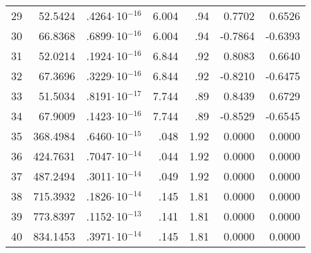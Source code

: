 {\begin{longtable}{|l||r|r|r|r|r|r|}
29 & 52.5424 & .4264$\cdot$\,10$^{-16}$ & 6.004 & .94 & 0.7702 & 0.6526 \\
30 & 66.8368 & .6899$\cdot$\,10$^{-16}$ & 6.004 & .94 & -0.7864 & -0.6393 \\
31 & 52.0214 & .1924$\cdot$\,10$^{-16}$ & 6.844 & .92 & 0.8083 & 0.6640 \\
32 & 67.3696 & .3229$\cdot$\,10$^{-16}$ & 6.844 & .92 & -0.8210 & -0.6475 \\
33 & 51.5034 & .8191$\cdot$\,10$^{-17}$ & 7.744 & .89 & 0.8439 & 0.6729 \\
34 & 67.9009 & .1423$\cdot$\,10$^{-16}$ & 7.744 & .89 & -0.8529 & -0.6545 \\
35 & 368.4984 & .6460$\cdot$\,10$^{-15}$ & .048 & 1.92 & 0.0000 & 0.0000 \\
36 & 424.7631 & .7047$\cdot$\,10$^{-14}$ & .044 & 1.92 & 0.0000 & 0.0000 \\
37 & 487.2494 & .3011$\cdot$\,10$^{-14}$ & .049 & 1.92 & 0.0000 & 0.0000 \\
38 & 715.3932 & .1826$\cdot$\,10$^{-14}$ & .145 & 1.81 & 0.0000 & 0.0000 \\
39 & 773.8397 & .1152$\cdot$\,10$^{-13}$ & .141 & 1.81 & 0.0000 & 0.0000 \\
40 & 834.1453 &  .3971$\cdot$\,10$^{-14}$ & .145 & 1.81 & 0.0000 & 0.0000 \\
\hline
\end{longtable}

}
